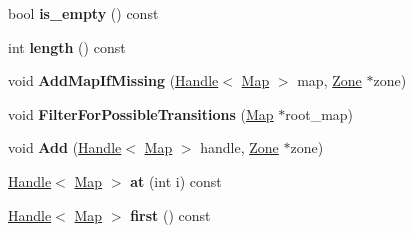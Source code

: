 \begin{DoxyCompactItemize}
\item 
\hypertarget{classv8_1_1internal_1_1_v8___f_i_n_a_l_aae4b4445d3ae1c8dee0f2844578ee13c}{}bool {\bfseries is\+\_\+empty} () const \label{classv8_1_1internal_1_1_v8___f_i_n_a_l_aae4b4445d3ae1c8dee0f2844578ee13c}

\item 
\hypertarget{classv8_1_1internal_1_1_v8___f_i_n_a_l_a60979317d806209562eb02b81421b9fd}{}int {\bfseries length} () const \label{classv8_1_1internal_1_1_v8___f_i_n_a_l_a60979317d806209562eb02b81421b9fd}

\item 
\hypertarget{classv8_1_1internal_1_1_v8___f_i_n_a_l_adb9e9e86d4ab98aa1464679365f74804}{}void {\bfseries Add\+Map\+If\+Missing} (\hyperlink{classv8_1_1internal_1_1_handle}{Handle}$<$ \hyperlink{classv8_1_1internal_1_1_map}{Map} $>$ map, \hyperlink{classv8_1_1internal_1_1_zone}{Zone} $\ast$zone)\label{classv8_1_1internal_1_1_v8___f_i_n_a_l_adb9e9e86d4ab98aa1464679365f74804}

\item 
\hypertarget{classv8_1_1internal_1_1_v8___f_i_n_a_l_a3f95b9e6a94d997ae7dc8cc2bf05e860}{}void {\bfseries Filter\+For\+Possible\+Transitions} (\hyperlink{classv8_1_1internal_1_1_map}{Map} $\ast$root\+\_\+map)\label{classv8_1_1internal_1_1_v8___f_i_n_a_l_a3f95b9e6a94d997ae7dc8cc2bf05e860}

\item 
\hypertarget{classv8_1_1internal_1_1_v8___f_i_n_a_l_a2b50592a944f53080d7be25a6efefb09}{}void {\bfseries Add} (\hyperlink{classv8_1_1internal_1_1_handle}{Handle}$<$ \hyperlink{classv8_1_1internal_1_1_map}{Map} $>$ handle, \hyperlink{classv8_1_1internal_1_1_zone}{Zone} $\ast$zone)\label{classv8_1_1internal_1_1_v8___f_i_n_a_l_a2b50592a944f53080d7be25a6efefb09}

\item 
\hypertarget{classv8_1_1internal_1_1_v8___f_i_n_a_l_a33d228f2b7032cb8a67f25e99ae7095c}{}\hyperlink{classv8_1_1internal_1_1_handle}{Handle}$<$ \hyperlink{classv8_1_1internal_1_1_map}{Map} $>$ {\bfseries at} (int i) const \label{classv8_1_1internal_1_1_v8___f_i_n_a_l_a33d228f2b7032cb8a67f25e99ae7095c}

\item 
\hypertarget{classv8_1_1internal_1_1_v8___f_i_n_a_l_a76bbfbbc116647050e601dfb38cb4331}{}\hyperlink{classv8_1_1internal_1_1_handle}{Handle}$<$ \hyperlink{classv8_1_1internal_1_1_map}{Map} $>$ {\bfseries first} () const \label{classv8_1_1internal_1_1_v8___f_i_n_a_l_a76bbfbbc116647050e601dfb38cb4331}


\end{DoxyCompactItemize}
